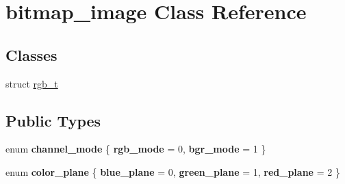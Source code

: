 \hypertarget{classbitmap__image}{}\section{bitmap\+\_\+image Class Reference}
\label{classbitmap__image}
\subsection*{Classes}
\begin{DoxyCompactItemize}
\item 
struct \mbox{\hyperlink{structbitmap__image_1_1rgb__t}{rgb\+\_\+t}}
\end{DoxyCompactItemize}
\subsection*{Public Types}
\begin{DoxyCompactItemize}
\item 
\mbox{\label{classbitmap__image_a859fd4659dd04951ea9d5857ce1f3bb3}} 
enum {\bfseries channel\+\_\+mode} \{ {\bfseries rgb\+\_\+mode} = 0, 
{\bfseries bgr\+\_\+mode} = 1
 \}
\item 
\mbox{\label{classbitmap__image_a87a9c6eeed645f246848d76988926b50}} 
enum {\bfseries color\+\_\+plane} \{ {\bfseries blue\+\_\+plane} = 0, 
{\bfseries green\+\_\+plane} = 1, 
{\bfseries red\+\_\+plane} = 2
 \}
\end{DoxyCompactItemize}
